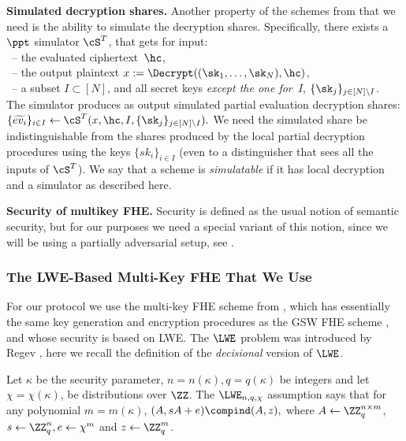 \medskip\noindent\textbf{Simulated decryption shares.}
Another property of the schemes from \cite{C:CleMcg15,EC:MukWic16} that we need is the ability to simulate the decryption shares. Specifically, there exists a $\ppt$ simulator $\cS^T$, that gets for input:\\
~-- the evaluated ciphertext~$\hc$,\\
~-- the output plaintext $x:= \Decrypt((\sk_1,\ldots, \sk_N), \hc)$,\\
~-- a subset $I \subset [N]$, and all secret keys \emph{except the one for~$I$}, $\{\sk_j\}_{j\in[N]\setminus I}$.\\
The simulator produces as output simulated partial evaluation decryption shares:
$\{\widetilde{ev_i}\}_{i\in I}\leftarrow \cS^{T}(x, \hc,I,\{\sk_j\}_{j\in[N]\setminus I}).$
We need the simulated share be indistinguishable from the shares produced by the local partial decryption procedures using the keys $\{sk_i\}_{i\in I}$ (even to a distinguisher that sees all the inputs of $\cS^T$). We say that a scheme is \emph{simulatable} if it has local decryption and a simulator as described here.

\medskip\noindent\textbf{Security of multikey FHE.}
Security is defined as the usual notion of semantic security, but for
our purposes we need a special variant of this notion, since we will
be using a partially adversarial setup, see .

\subsubsection{The LWE-Based Multi-Key FHE That We Use}\label{MFHE}
For our protocol we use the multi-key FHE scheme from \cite{C:CleMcg15,EC:MukWic16}, which has essentially the same key generation and encryption procedures as the GSW FHE scheme \cite{C:GenSahWat13}, and whose security is based on LWE.
\iffalse
  The $\LWE$ problem was introduced by Regev \cite{Reg09}, here we
  recall the definition of the \emph{decisional} version of $\LWE$.
  \begin{definition} Let $\kappa$ be the security
  parameter, $n = n(\kappa), q = q(\kappa)$ be integers and let
  $\chi=\chi (\kappa)$, be distributions over $\ZZ$. The
  $\LWE_{n,q,\chi}$ assumption says that for any polynomial $m = m(\kappa)$,
  $(A, sA + e) \compind  (A, z), $ where $A \leftarrow  \ZZ^{n\times
      m}_q$, $ s    \leftarrow \ZZ^n_q, e  \leftarrow \chi^m$ and $z
    \leftarrow  \ZZ^m_q$.
  \label{def:LWE}
  \end{definition}
